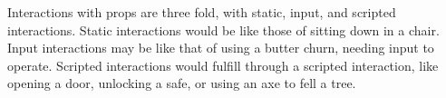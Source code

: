 Interactions with props are three fold, with static, input, and scripted interactions. Static interactions would be like those of sitting down in a chair. Input interactions may be like that of using a butter churn, needing input to operate. Scripted interactions would fulfill through a scripted interaction, like opening a door, unlocking a safe, or using an axe to fell a tree.